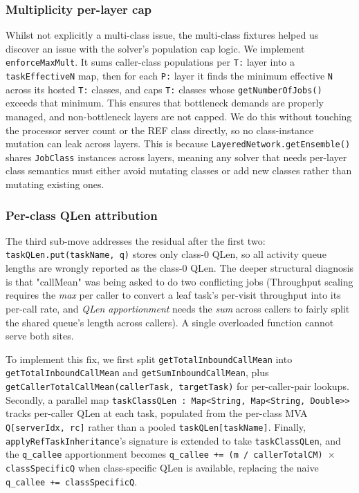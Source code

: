 \subsubsection*{Multiplicity per-layer cap}

Whilst not explicitly a multi-class issue, the multi-class fixtures helped us discover an issue with the solver's population cap logic. We implement \texttt{enforceMaxMult}. It sums caller-class populations per \texttt{T:} layer into a \texttt{taskEffectiveN} map, then for each \texttt{P:} layer it finds the minimum effective \texttt{N} across its hosted \texttt{T:} classes, and caps \texttt{T:} classes whose \texttt{getNumberOfJobs()} exceeds that minimum. This ensures that bottleneck demands are properly managed, and non-bottleneck layers are not capped. We do this without touching the processor server count or the REF class directly, so no class-instance mutation can leak across layers. This is because \texttt{LayeredNetwork.getEnsemble()} shares \texttt{JobClass} instances across layers, meaning any solver that needs per-layer class semantics must either avoid mutating classes or add new classes rather than mutating existing ones.

\subsubsection*{Per-class QLen attribution}

The third sub-move addresses the residual after the first two: \texttt{taskQLen.put(taskName, q)} stores only class-0 QLen, so all activity queue lengths are wrongly reported as the class-0 QLen. The deeper structural diagnosis is that "callMean" was being asked to do two conflicting jobs (Throughput scaling requires the \textit{max} per caller to convert a leaf task's per-visit throughput into its per-call rate, and \textit{QLen apportionment} needs the \textit{sum} across callers to fairly split the shared queue's length across callers). A single overloaded function cannot serve both sites.

To implement this fix, we first split \texttt{getTotalInboundCallMean} into \texttt{getTotalInboundCallMean} and \texttt{getSumInboundCallMean}, plus \texttt{getCallerTotalCallMean(callerTask, targetTask)} for per-caller-pair lookups. Secondly, a parallel map \texttt{taskClassQLen : Map<String, Map<String, Double>>} tracks per-caller QLen at each task, populated from the per-class MVA \texttt{Q[serverIdx, rc]} rather than a pooled \texttt{taskQLen[taskName]}. Finally, \texttt{applyRefTaskInheritance}'s signature is extended to take \texttt{taskClassQLen}, and the \texttt{q\_callee} apportionment becomes \texttt{q\_callee += (m / callerTotalCM) $\times$ classSpecificQ} when class-specific QLen is available, replacing the naive \texttt{q\_callee += classSpecificQ}.

